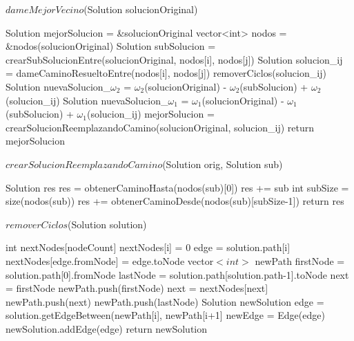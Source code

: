 \begin{algorithm}[H]
\caption{$dameMejorVecino$(Solution solucionOriginal)}
\begin{algorithmic}[1]	
          \State Solution mejorSolucion = \&solucionOriginal
	  \State vector<int> nodos = \&nodos(solucionOriginal)
			\State Solution subSolucion = crearSubSolucionEntre(solucionOriginal, nodos[i], nodos[j])
			\State Solution solucion\_ij = dameCaminoResueltoEntre(nodos[i], nodos[j])
                        \State removerCiclos(solucion\_ij)
			\State Solution nuevaSolucion\_$\omega_2$ = $\omega_2$(solucionOriginal) - $\omega_2$(subSolucion) + $\omega_2$(solucion\_ij)
			\State Solution nuevaSolucion\_$\omega_1$ = $\omega_1$(solucionOriginal) - $\omega_1$(subSolucion) + $\omega_1$(solucion\_ij)			
				\State mejorSolucion = crearSolucionReemplazandoCamino(solucionOriginal, solucion\_ij)
			\EndIf
		\EndFor
	\EndFor
	\State return mejorSolucion
\end{algorithmic}
\end{algorithm}

\begin{algorithm}[H]
\caption{$crearSolucionReemplazandoCamino$(Solution orig, Solution sub)}
\begin{algorithmic}[1]	
	 \State Solution res
	 \State res = obtenerCaminoHasta(nodos(sub)[0])
	 \State res += sub
	 \State int subSize = size(nodos(sub))
	 \State res += obtenerCaminoDesde(nodos(sub)[subSize-1])	  
	\State return res
\end{algorithmic}
\end{algorithm}

\begin{algorithm}[H]
\caption{$removerCiclos$(Solution solution)}
\begin{algorithmic}[1]	
	 \State int nextNodes[nodeCount]
	 	\State nextNodes[i] = 0
	\EndFor
		 \State edge = solution.path[i]
	 	\State nextNodes[edge.fromNode] = edge.toNode
	\EndFor	
	 \State vector$<int>$ newPath
	 \State firstNode = solution.path[0].fromNode
	 \State lastNode = solution.path[solution.path-1].toNode
	 \State next = firstNode
	 \State newPath.push(firstNode)
	 	\State next = nextNodes[next]
		\State newPath.push(next)
	\EndWhile
	\State newPath.push(lastNode)
	\State Solution newSolution
		\State edge = solution.getEdgeBetween(newPath[i], newPath[i+1]
		\State newEdge = Edge(edge)
		\State newSolution.addEdge(edge)
	\EndFor
	\State return newSolution
\end{algorithmic}
\end{algorithm}

